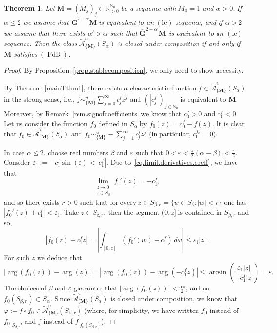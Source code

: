 \documentclass[11pt,a4paper]{article}
\theoremstyle{plain}
\newtheorem{theorem}[proposition]{Theorem}
\theoremstyle{definition}
\newcommand{\RR}{\mathbb{R}}
\newcommand{\NN}{\mathbb{N}}
\newcommand{\M}{\mathbf{M}}
\newcommand{\G}{\mathbf{G}}
\let\on=\operatorname
\def\a{\alpha}
\def\b{\beta}
\begin{document}
\begin{theorem}\label{thm.stablecomposition}
Let $\M=(M_j)_j\in\RR_{>0}^{\NN_0}$ be a sequence with $M_0=1$ and $\alpha>0$. If $\alpha\leq 2$ we assume that $\overline{\G}^{2-\alpha}\M$ is equivalent to an \hyperlink{lc}{$(\text{lc})$} sequence, and if $\alpha>2$ we assume that there exists $\a'>\a$ such that $\overline{\G}^{2-\alpha'}\M$ is equivalent to an \hyperlink{lc}{$(\text{lc})$} sequence. Then the class $\mathcal{\widetilde{A}}^{u}_{\{\M\}} (S_\alpha)$ is closed under composition if and only if $\M$ satisfies  \hyperlink{s-FdB}{$(\on{FdB})$}. 
\end{theorem}
 \begin{proof} By Proposition~\ref{prop.stablecomposition}, we only need to show necessity. 
 
By Theorem~\ref{mainTthm1}, there exists a characteristic function $f\in \mathcal{\widetilde{A}}^{u}_{\{\M\}} (S_\alpha)$ in the strong sense, i.e., $f\sim^u_{\{\M\}} \sum_{j=0}^\infty c^f_j z^j$ and $(|c^f_j|)_{j\in\NN_0}$ is equivalent to $\M$. Moreover, by Remark~\ref{rem.signofcoefficients} we know that $c_0^f>0$ and $c_1^f<0$. Let us consider the function $f_0$ defined in $S_\a$ by $f_0(z)=c_0^f-f(z)$. It is clear that $f_0\in \mathcal{\widetilde{A}}^{u}_{\{\M\}} (S_\alpha)$ and $f_0\sim^u_{\{\M\}} -\sum_{j=1}^\infty c^f_j z^j$ (in particular, $c_0^{f_0}=0$). 

In case $\alpha\le 2$, choose real numbers $\b$ and $\varepsilon$ such that $0<\varepsilon<\frac{\pi}{2}(\alpha-\b)<\frac{\pi}{2}$. Consider $\varepsilon_1:=-c_1^f\sin(\varepsilon)<|c_1^f|$.
Due to~\eqref{eq.limit.derivatives.coeff}, we have that
$$
\lim_{\substack{z\to 0\\z\in S_{\b}}}f_0'(z)=-c_1^f,
$$
and so there exists $r>0$ such that for every $z\in S_{\b,r}=\{w\in S_{\b}\colon |w|<r\}$ one has $|f_0'(z)+c_1^f|<\varepsilon_1$. Take $z\in S_{\b,r}$, then the segment $(0,z]$ is contained in $S_{\b,r}$ and so,
$$
|f_0(z)+c_1^fz|=\left|\int_{[0,z]}(f_0'(w)+c_1^f)\,dw\right|\le \varepsilon_1|z|.
$$
For such $z$ we deduce that
$$
|\arg(f_0(z))-\arg(z)|=|\arg(f_0(z))-\arg(-c_1^fz)|\le \arcsin\left(\frac{\varepsilon_1|z|}{-c_1^f|z|}\right)=\varepsilon.
$$
The choices of $\b$ and $\varepsilon$ guarantee that $|\arg(f_0(z))|<\frac{\a\pi}{2}$, and so $f_0(S_{\b,r})\subset S_{\a}$. Since $\mathcal{\widetilde{A}}^{u}_{\{\M\}} (S_\alpha)$ is closed under composition, we know that $\varphi:= f\circ f_0 \in \mathcal{\widetilde{A}}^{u}_{\{\M\}} (S_{\b,r})$ (where, for simplicity, we have written $f_0$ instead of $f_0|_{S_{\b,r}}$, and $f$ instead of $f|_{f_0(S_{\b,r})}$).


\end{proof}
\end{document}
